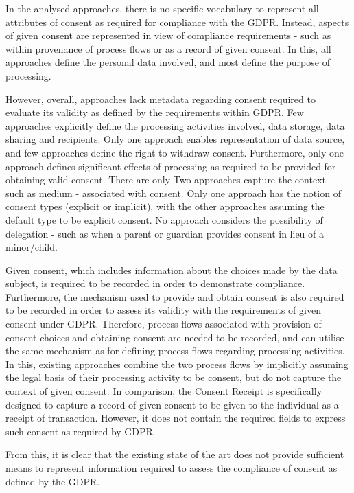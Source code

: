 In the analysed approaches, there is no specific vocabulary to represent all attributes of consent as required for compliance with the GDPR. Instead, aspects of given consent are represented in view of compliance requirements - such as within provenance of process flows or as a record of given consent. In this, all approaches define the personal data involved, and most define the purpose of processing. 

However, overall, approaches lack metadata regarding consent required to evaluate its validity as defined by the requirements within GDPR. Few approaches explicitly define the processing activities involved, data storage, data sharing and recipients. Only one approach enables representation of data source, and few approaches define the right to withdraw consent.  Furthermore, only one approach defines significant effects of processing as required to be provided for obtaining valid consent. There are only Two approaches capture the context - such as medium - associated with consent. Only one approach has the notion of consent types (explicit or implicit), with the other approaches assuming the default type to be explicit consent. No approach considers the possibility of delegation - such as when a parent or guardian provides consent in lieu of a minor/child.

Given consent, which includes information about the choices made by the data subject, is required to be recorded in order to demonstrate compliance. Furthermore, the mechanism used to provide and obtain consent is also required to be recorded in order to assess its validity with the requirements of given consent under GDPR. Therefore, process flows associated with provision of consent choices and obtaining consent are needed to be recorded, and can utilise the same mechanism as for defining process flows regarding processing activities. In this, existing approaches combine the two process flows by implicitly assuming the legal basis of their processing activity to be consent, but do not capture the context of given consent. In comparison, the Consent Receipt is specifically designed to capture a record of given consent to be given to the individual as a receipt of transaction. However, it does not contain the required fields to express such consent as required by GDPR.

From this, it is clear that the existing state of the art does not provide sufficient means to represent information required to assess the compliance of consent as defined by the GDPR. 

